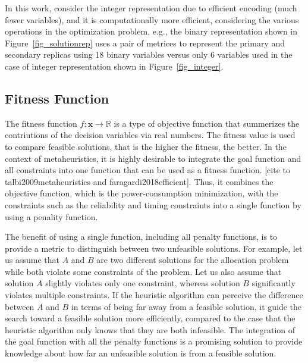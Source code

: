 In this work, consider the integer representation due to efficient encoding (much fewer variables), and  it is computationally more efficient, considering the various operations in the optimization problem, e.g., the binary representation shown in Figure~\ref{fig_solutionrep} uses a pair of metrices to represent the primary and secondary replicas using 18 binary variables versus only 6 variables used in the case of integer representation shown in Figure~\ref{fig_integer}.

\subsection{Fitness Function}
The fitness function $f:\textbf{x}\rightarrow \mathbb{R}$ is a type of objective function that summerizes the contriutions of the decision variables via real numbers. The fitness value is used to compare feasible solutions, that is the higher the fitness, the better. In the context of metaheuristics, it is highly desirable to integrate the goal function and all constraints into one function that can be
used as a fitness function. [cite to talbi2009metaheuristics and faragardi2018efficient]. Thus, it combines the objective function, which is the power-consumption minimization, with the constraints such as the reliability and timing constraints into a single function by using a penality function. 


The benefit of using a single function, including all penalty functions, is to provide a metric to distinguish between two unfeasible solutions. For example, let us assume that $A$ and $B$ are two different solutions for the allocation problem while both violate
some constraints of the problem. Let us also assume that solution
$A$ slightly violates only one constraint, whereas solution
$B$ significantly violates multiple constraints. If the heuristic algorithm can perceive the difference between $A$ and $B$
in terms of being far away from a feasible solution, it guide the search toward a feasible solution more efficiently, compared to the case that the heuristic algorithm only knows that they are both infeasible. The integration of the goal function with all
the penalty functions is a promising solution to provide knowledge about how far an unfeasible solution is from a feasible
solution. 

